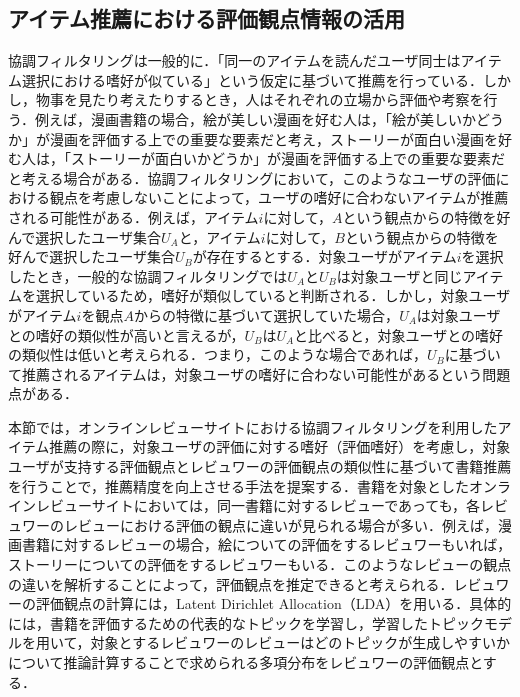 \documentclass[a4paper,11pt,oneside,openany]{jsbook}
\begin{document}
\subsection{アイテム推薦における評価観点情報の活用}
協調フィルタリングは一般的に．「同一のアイテムを読んだユーザ同士はアイテム選択における嗜好が似ている」という仮定に基づいて推薦を行っている．しかし，物事を見たり考えたりするとき，人はそれぞれの立場から評価や考察を行う．例えば，漫画書籍の場合，絵が美しい漫画を好む人は，「絵が美しいかどうか」が漫画を評価する上での重要な要素だと考え，ストーリーが面白い漫画を好む人は，「ストーリーが面白いかどうか」が漫画を評価する上での重要な要素だと考える場合がある．協調フィルタリングにおいて，このようなユーザの評価における観点を考慮しないことによって，ユーザの嗜好に合わないアイテムが推薦される可能性がある．例えば，アイテム$i$に対して，$A$という観点からの特徴を好んで選択したユーザ集合$U_A$と，アイテム$i$に対して，$B$という観点からの特徴を好んで選択したユーザ集合$U_B$が存在するとする．対象ユーザがアイテム$i$を選択したとき，一般的な協調フィルタリングでは$U_A$と$U_B$は対象ユーザと同じアイテムを選択しているため，嗜好が類似していると判断される．しかし，対象ユーザがアイテム$i$を観点$A$からの特徴に基づいて選択していた場合，$U_A$は対象ユーザとの嗜好の類似性が高いと言えるが，$U_B$は$U_A$と比べると，対象ユーザとの嗜好の類似性は低いと考えられる．つまり，このような場合であれば，$U_B$に基づいて推薦されるアイテムは，対象ユーザの嗜好に合わない可能性があるという問題点がある．
\par
本節では，オンラインレビューサイトにおける協調フィルタリングを利用したアイテム推薦の際に，対象ユーザの評価に対する嗜好（評価嗜好）を考慮し，対象ユーザが支持する評価観点とレビュワーの評価観点の類似性に基づいて書籍推薦を行うことで，推薦精度を向上させる手法を提案する．書籍を対象としたオンラインレビューサイトにおいては，同一書籍に対するレビューであっても，各レビュワーのレビューにおける評価の観点に違いが見られる場合が多い．例えば，漫画書籍に対するレビューの場合，絵についての評価をするレビュワーもいれば，ストーリーについての評価をするレビュワーもいる．このようなレビューの観点の違いを解析することによって，評価観点を推定できると考えられる．レビュワーの評価観点の計算には，Latent Dirichlet Allocation（LDA）\cite{Blei}を用いる．具体的には，書籍を評価するための代表的なトピックを学習し，学習したトピックモデルを用いて，対象とするレビュワーのレビューはどのトピックが生成しやすいかについて推論計算することで求められる多項分布をレビュワーの評価観点とする．
\end{document}
